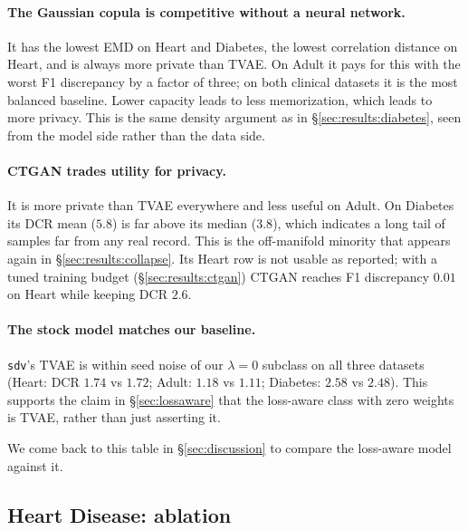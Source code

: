 \documentclass[11pt,a4paper]{article}
\begin{document}
\paragraph{The Gaussian copula is competitive without a neural network.} It
has the lowest EMD on Heart and Diabetes, the lowest correlation distance on
Heart, and is always more private than TVAE. On Adult it pays for this with
the worst F1 discrepancy by a factor of three; on both clinical datasets it is
the most balanced baseline. Lower capacity leads to less memorization, which
leads to more privacy. This is the same density argument as in
\S\ref{sec:results:diabetes}, seen from the model side rather than the data
side.

\paragraph{CTGAN trades utility for privacy.} It is more private than TVAE
everywhere and less useful on Adult. On Diabetes its DCR mean ($5.8$) is far
above its median ($3.8$), which indicates a long tail of samples far from any
real record. This is the off-manifold minority that appears again in
\S\ref{sec:results:collapse}. Its Heart row is not usable as reported; with a
tuned training budget (\S\ref{sec:results:ctgan}) CTGAN reaches F1
discrepancy $0.01$ on Heart while keeping DCR $2.6$.

\paragraph{The stock model matches our baseline.} \texttt{sdv}'s TVAE is
within seed noise of our $\lambda = 0$ subclass on all three datasets (Heart:
DCR $1.74$ vs $1.72$; Adult: $1.18$ vs $1.11$; Diabetes: $2.58$ vs $2.48$).
This supports the claim in \S\ref{sec:lossaware} that the loss-aware class with
zero weights is TVAE, rather than just asserting it.

We come back to this table in \S\ref{sec:discussion} to compare the
loss-aware model against it.

\subsection{Heart Disease: ablation}
\end{document}
